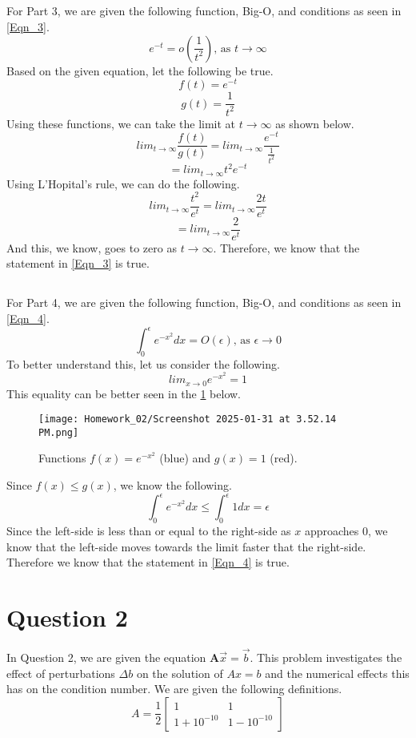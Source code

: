 \documentclass{article}
\begin{document}
\subsection{}
For Part 3, we are given the following function, Big-O, and conditions as seen in \ref{Eqn_3}.
\begin{equation}
    \label{Eqn_3}
    e^{-t} = o(\frac{1}{t^2}) \mbox{, as } t \to \infty
\end{equation}
Based on the given equation, let the following be true.
\[
f(t) = e^{-t}
\]
\[
g(t) = \frac{1}{t^2}
\]
Using these functions, we can take the limit at \(t \to \infty\) as shown below.
\[
lim_{t \to \infty}\frac{f(t)}{g(t)} = lim_{t \to \infty}\frac{e^{-t}}{\frac{1}{t^2}}
\]
\[
= lim_{t \to \infty}t^2e^{-t}
\]
Using L'Hopital's rule, we can do the following.
\[
lim_{t \to \infty}\frac{t^2}{e^{t}} = lim_{t \to \infty}\frac{2t}{e^t}
\]
\[
= lim_{t \to \infty}\frac{2}{e^t}
\]
And this, we know, goes to zero as \(t \to \infty\). Therefore, we know that the statement in \ref{Eqn_3} is true.

\subsection{}
For Part 4, we are given the following function, Big-O, and conditions as seen in \ref{Eqn_4}.
\begin{equation}
    \label{Eqn_4}
    \int_{0}^{\epsilon}e^{-x^2}dx = O(\epsilon) \mbox{, as } \epsilon \to 0
\end{equation}
To better understand this, let us consider the following.
\[
lim_{x \to 0}e^{-x^2} = 1
\]
This equality can be better seen in the \ref{fig:Fig_1} below.
\begin{figure}[h!]
    \centering
    \texttt{[image: Homework\_02/Screenshot 2025-01-31 at 3.52.14 PM.png]}
    \caption{Functions \(f(x)=e^{-x^2}\) (blue) and \(g(x) = 1\) (red).}
    \label{fig:Fig_1}
\end{figure}
\newpage
Since \(f(x) \leq g(x)\), we know the following.
\[
\int_{0}^{\epsilon}e^{-x^2}dx \leq \int_{0}^{\epsilon}1dx = \epsilon
\]
Since the left-side is less than or equal to the right-side as \(x\) approaches 0, we know that the left-side moves towards the limit faster that the right-side. Therefore we know that the statement in \ref{Eqn_4} is true.


\section{Question 2}
In Question 2, we are given the equation \(\textbf{A}\vec{x}=\vec{b}.\)
This problem investigates the effect of perturbations \( \Delta b \) on the solution of \( A x = b \) and the numerical effects this has on the condition number. We are given the following definitions.
\[
A = \frac{1}{2}
\begin{bmatrix}
    1 & 1 \\
    1 + 10^{-10} & 1 - 10^{-10}
\end{bmatrix}
\]
\end{document}
